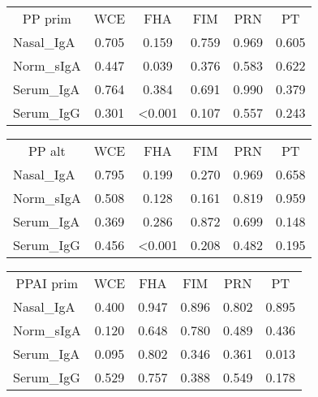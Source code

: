 \documentclass[
]{article}
\begin{document}
\begin{tabular}{>{}l|>{}c|>{}c|>{}c|>{}c|c}
\hline
\multicolumn{1}{c|}{PP prim} & \multicolumn{1}{c|}{WCE} & \multicolumn{1}{c|}{FHA} & \multicolumn{1}{c|}{FIM} & \multicolumn{1}{c|}{PRN} & \multicolumn{1}{c}{PT} \\
\cline{1-1} \cline{2-2} \cline{3-3} \cline{4-4} \cline{5-5} \cline{6-6}
Nasal\_IgA & 0.705 & 0.159 & 0.759 & 0.969 & 0.605\\
\hline
Norm\_sIgA & 0.447 & 0.039 & 0.376 & 0.583 & 0.622\\
\hline
Serum\_IgA & 0.764 & 0.384 & 0.691 & 0.990 & 0.379\\
\hline
Serum\_IgG & 0.301 & <0.001 & 0.107 & 0.557 & 0.243\\
\hline
\end{tabular}

\begin{tabular}{>{}l|>{}c|>{}c|>{}c|>{}c|c}
\hline
\multicolumn{1}{c|}{PP alt} & \multicolumn{1}{c|}{WCE} & \multicolumn{1}{c|}{FHA} & \multicolumn{1}{c|}{FIM} & \multicolumn{1}{c|}{PRN} & \multicolumn{1}{c}{PT} \\
\cline{1-1} \cline{2-2} \cline{3-3} \cline{4-4} \cline{5-5} \cline{6-6}
Nasal\_IgA & 0.795 & 0.199 & 0.270 & 0.969 & 0.658\\
\hline
Norm\_sIgA & 0.508 & 0.128 & 0.161 & 0.819 & 0.959\\
\hline
Serum\_IgA & 0.369 & 0.286 & 0.872 & 0.699 & 0.148\\
\hline
Serum\_IgG & 0.456 & <0.001 & 0.208 & 0.482 & 0.195\\
\hline
\end{tabular}

\begin{tabular}{>{}l|>{}c|>{}c|>{}c|>{}c|c}
\hline
\multicolumn{1}{c|}{PPAI prim} & \multicolumn{1}{c|}{WCE} & \multicolumn{1}{c|}{FHA} & \multicolumn{1}{c|}{FIM} & \multicolumn{1}{c|}{PRN} & \multicolumn{1}{c}{PT} \\
\cline{1-1} \cline{2-2} \cline{3-3} \cline{4-4} \cline{5-5} \cline{6-6}
Nasal\_IgA & 0.400 & 0.947 & 0.896 & 0.802 & 0.895\\
\hline
Norm\_sIgA & 0.120 & 0.648 & 0.780 & 0.489 & 0.436\\
\hline
Serum\_IgA & 0.095 & 0.802 & 0.346 & 0.361 & 0.013\\
\hline
Serum\_IgG & 0.529 & 0.757 & 0.388 & 0.549 & 0.178\\
\hline
\end{tabular}
\end{document}
